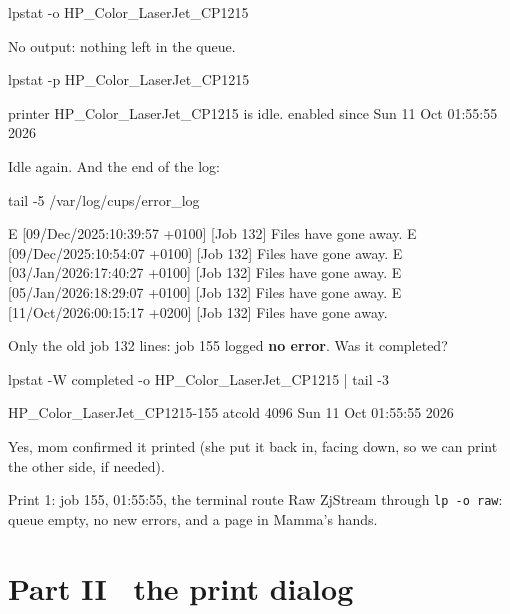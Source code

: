 \documentclass[11pt,a4paper]{article}
\newcommand{\bugemo}{\texttwemoji{lady beetle}}
\begin{document}
\begin{pane}
lpstat -o HP_Color_LaserJet_CP1215
\end{pane}

No output: nothing left in the queue.

\begin{pane}
lpstat -p HP_Color_LaserJet_CP1215
\end{pane}
\begin{cmdout}
printer HP_Color_LaserJet_CP1215 is idle.  enabled since Sun 11 Oct 01:55:55 2026
\end{cmdout}

Idle again. And the end of the log:

\begin{pane}
tail -5 /var/log/cups/error_log
\end{pane}
\begin{cmdout}
E [09/Dec/2025:10:39:57 +0100] [Job 132] Files have gone away.
E [09/Dec/2025:10:54:07 +0100] [Job 132] Files have gone away.
E [03/Jan/2026:17:40:27 +0100] [Job 132] Files have gone away.
E [05/Jan/2026:18:29:07 +0100] [Job 132] Files have gone away.
E [11/Oct/2026:00:15:17 +0200] [Job 132] Files have gone away.
\end{cmdout}

Only the old job 132 lines: job 155 logged \textbf{no error}. Was it completed?

\begin{pane}
lpstat -W completed -o HP_Color_LaserJet_CP1215 | tail -3
\end{pane}
\begin{cmdout}
HP_Color_LaserJet_CP1215-155 atcold            4096   Sun 11 Oct 01:55:55 2026
\end{cmdout}

\begin{alf}
Yes, mom confirmed it printed (she put it back in, facing down, so we can print the other side, if needed).
\end{alf}

\begin{printed}{Print 1: job 155, 01:55:55, the terminal route}
Raw ZjStream through \texttt{lp -o raw}: queue empty, no new errors, and a page in Mamma's hands.
\end{printed}

\section{Part II \texorpdfstring{\bugemo\ }{: }the print dialog}
\end{document}
